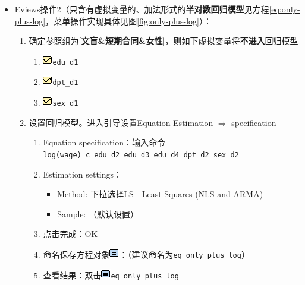 \documentclass[12pt,(landscape,a4paper),(portrait,a4paper)]{article}
\providecommand{\tightlist}{%
  \setlength{\itemsep}{0pt}\setlength{\parskip}{0pt}}
\theoremstyle{definition}
\theoremstyle{definition}
\theoremstyle{definition}
\theoremstyle{remark}
\begin{document}
\begin{itemize}
\tightlist
\item
  Eviews操作2（只含有虚拟变量的、加法形式的\textbf{半对数回归模型}见方程\eqref{eq:only-plus-log}，菜单操作实现具体见图\ref{fig:only-plus-log}）：

  \begin{enumerate}
  \def\labelenumi{\arabic{enumi})}
  \tightlist
  \item
    确定参照组为{[}\textbf{文盲\&短期合同\&女性}{]}，则如下虚拟变量将\textbf{不进入}回归模型

    \begin{enumerate}
    \def\labelenumii{\alph{enumii}.}
    \tightlist
    \item
      \includegraphics{picture/object/Series.png}\texttt{edu\_d1}
    \item
      \includegraphics{picture/object/Series.png}\texttt{dpt\_d1}
    \item
      \includegraphics{picture/object/Series.png}\texttt{sex\_d1}
    \end{enumerate}
  \item
    设置回归模型。进入引导设置Equation Estimation \(\Rightarrow\)
    specification

    \begin{enumerate}
    \def\labelenumii{\alph{enumii}.}
    \tightlist
    \item
      Equation
      specification：输入命令\texttt{log(wage)\ c\ edu\_d2\ edu\_d3\ edu\_d4\ dpt\_d2\ sex\_d2}
    \item
      Estimation settings：

      \begin{itemize}
      \tightlist
      \item
        Method: 下拉选择LS - Least Squares (NLS and ARMA)
      \item
        Sample: （默认设置）
      \end{itemize}
    \item
      点击完成：OK
    \item
      命名保存方程对象\includegraphics{picture/object/Equation.png}：（建议命名为\texttt{eq\_only\_plus\_log}）
    \item
      查看结果：双击\includegraphics{picture/object/Equation.png}\texttt{eq\_only\_plus\_log}
    \end{enumerate}
  \end{enumerate}
\end{itemize}
\end{document}
